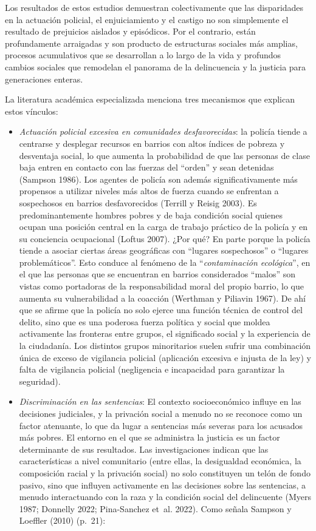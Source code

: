\documentclass[
  spanish,
  letterpaper,
  DIV=11,
  numbers=noendperiod]{scrreprt}
\begin{document}
Los resultados de estos estudios demuestran colectivamente que las
disparidades en la actuación policial, el enjuiciamiento y el castigo no
son simplemente el resultado de prejuicios aislados y episódicos. Por el
contrario, están profundamente arraigadas y son producto de estructuras
sociales más amplias, procesos acumulativos que se desarrollan a lo
largo de la vida y profundos cambios sociales que remodelan el panorama
de la delincuencia y la justicia para generaciones enteras.

La literatura académica especializada menciona tres mecanismos que
explican estos vínculos:

\begin{itemize}
\item
  \emph{Actuación policial excesiva en comunidades desfavorecidas}: la
  policía tiende a centrarse y desplegar recursos en barrios con altos
  índices de pobreza y desventaja social, lo que aumenta la probabilidad
  de que las personas de clase baja entren en contacto con las fuerzas
  del ``orden'' y sean detenidas (Sampson 1986). Los agentes de policía
  son además significativamente más propensos a utilizar niveles más
  altos de fuerza cuando se enfrentan a sospechosos en barrios
  desfavorecidos (Terrill y Reisig 2003). Es predominantemente hombres
  pobres y de baja condición social quienes ocupan una posición central
  en la carga de trabajo práctico de la policía y en su conciencia
  ocupacional (Loftus 2007). ¿Por qué? En parte porque la policía tiende
  a asociar ciertas áreas geográficas con ``lugares sospechosos'' o
  ``lugares problemáticos''. Esto conduce al fenómeno de la
  ``\emph{contaminación ecológica}'', en el que las personas que se
  encuentran en barrios considerados ``malos'' son vistas como
  portadoras de la responsabilidad moral del propio barrio, lo que
  aumenta su vulnerabilidad a la coacción (Werthman y Piliavin 1967). De
  ahí que se afirme que la policía no solo ejerce una función técnica de
  control del delito, sino que es una poderosa fuerza política y social
  que moldea activamente las fronteras entre grupos, el significado
  social y la experiencia de la ciudadanía. Los distintos grupos
  minoritarios suelen sufrir una combinación única de exceso de
  vigilancia policial (aplicación excesiva e injusta de la ley) y falta
  de vigilancia policial (negligencia e incapacidad para garantizar la
  seguridad).
\item
  \emph{Discriminación en las sentencias}: El contexto socioeconómico
  influye en las decisiones judiciales, y la privación social a menudo
  no se reconoce como un factor atenuante, lo que da lugar a sentencias
  más severas para los acusados más pobres. El entorno en el que se
  administra la justicia es un factor determinante de sus resultados.
  Las investigaciones indican que las características a nivel
  comunitario (entre ellas, la desigualdad económica, la composición
  racial y la privación social) no solo constituyen un telón de fondo
  pasivo, sino que influyen activamente en las decisiones sobre las
  sentencias, a menudo interactuando con la raza y la condición social
  del delincuente (Myers 1987; Donnelly 2022; Pina-Sanchez et~al. 2022).
  Como señala Sampson y Loeffler (2010) (p.~21):
\end{itemize}
\end{document}
